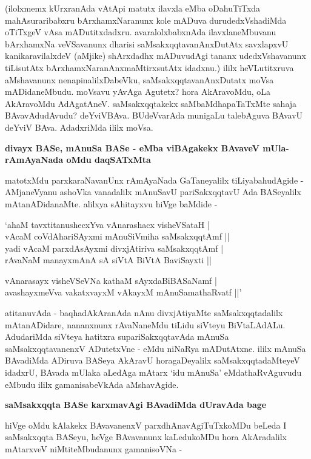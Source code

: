 (ilolxmemx kUrxranAda vAtApi matutx ilavxla eMba oDahuTiTxda mahAsuraribabxru bArxhamxNaranunx kole mADuva durudedxVshadiMda oTiTxgeV vAsa mADutitxdadxru. avaralolxbabxnAda ilavxlaneMbuvanu bArxhamxNa veVSavanunx dharisi saMsakxqqtavanAnxDutAtx savxlapxvU kanikaravilalxdeV (aMjike) shArxdadhx mADuvudAgi tananx udedxVshavanunx tiLisutAtx bArxhamxNaranAnxmaMtirxsutAtx idadxnu.) ililx heVLutitxruva aMshavanunx nenapinalilxDabeVku, saMsakxqqtavanAnxDutatx moVsa mADidaneMbudu. moVsavu yAvAga Agutetx? hora AkAravoMdu, oLa AkAravoMdu AdAgatAneV. saMsakxqqtakekx saMbaMdhapaTaTxMte sahaja BAvavAdudAvudu? deYviVBAva. BUdeVvarAda munigaLu talebAguva BAvavU deYviV BAva. AdadxriMda ililx moVsa.

\noindent
\textbf{divayx BASe, mAnuSa BASe - eMba viBAgakekx BAvaveV mUla-rAmAyaNada oMdu daqSATxMta}\label{page14}

matotxMdu parxkaraNavanUnx rAmAyaNada GaTaneyalilx tiLiyabahudAgide - AMjaneVyanu ashoVka vanadalilx mAnuSavU pariSakxqqtavU Ada BASeyalilx mAtanADidanaMte. alilxya sAhitayxvu hiVge baMdide - 

\begin{shloka}
`ahaM tavxtitanushecxYva vAnarashacx visheVSataH |\\\label{14}
vAcaM coVdAhariSAyxmi mAnuSiVmiha saMsakxqqtAmf ||\\

yadi vAcaM parxdAsAyxmi divxjAtiriva saMsakxqqtAmf |\\
rAvaNaM manayxmAnA sA siVtA BiVtA BaviSayxti ||

vAnarasayx visheVSeVNa kathaM sAyxdaBiBASaNamf |\\
avashayxmeVva vakatxvayxM vAkayxM mAnuSamathaRvatf ||'
\end{shloka}

atitanuvAda - baqhadAkAranAda nAnu divxjAtiyaMte saMsakxqqtadalilx mAtanADidare, nananxnunx rAvaNaneMdu tiLidu siVteyu BiVtaLAdALu. AdudariMda siVteya hatitxra supariSakxqqtavAda mAnuSa saMsakxqqtavanenxV ADutetxVne - eMdu niNaRya mADutAtxne. ililx mAnuSa BAvadiMda ADiruva BASeya AkAravU horagaDeyalilx saMsakxqqtadaMteyeV idadxrU, BAvada mUlaka aLedAga mAtarx `idu mAnuSa' eMdathaRvAguvudu eMbudu ililx gamanisabeVkAda aMshavAgide.

\noindent
\textbf{saMsakxqqta BASe karxmavAgi BAvadiMda dUravAda bage}\label{page15}

hiVge oMdu kAlakekx BAvavanenxV parxdhAnavAgiTuTxkoMDu beLeda I saMsakxqqta BASeyu, heVge BAvavanunx kaLedukoMDu hora AkAradalilx mAtarxveV niMtiteMbudanunx gamanisoVNa - 

